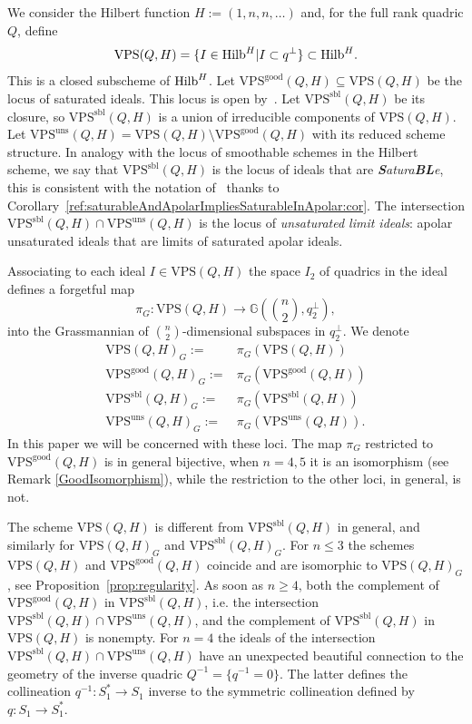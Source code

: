 \documentclass{amsart}
\newcommand{\Hilb}{{\rm{Hilb}}}
\def\Gr #1#2{{\mathbb G}\left(#1,#2\right)} %
\newcommand{\VPSsbl}{{\mathrm{VPS}}^{\mathrm{sbl}}(Q, H)}
\newcommand{\VPSuns}{{\mathrm{VPS}}^{\mathrm{uns}}(Q, H)}
\newcommand{\VPSgood}{{\mathrm{VPS}}^{\mathrm{good}}(Q, H)}
\newcommand{\VPS}{\mathrm{VPS}(Q, H)}
\begin{document}
We consider the Hilbert function $H:=(1,n,n,\ldots )$ and, for the full rank
quadric $Q$, define
$$\VPS=\{I\in \Hilb^H| I\subset q^\perp\}\subset \Hilb^H.$$
This is a closed subscheme of $\Hilb^H$.
Let $\VPSgood\subseteq \VPS$ be the locus of saturated ideals. This
locus is
open by~\cite[Theorem~2.6]{JM}. Let $\VPSsbl$ be its closure, so $\VPSsbl$ is
a union of irreducible components of $\VPS$. Let $\VPSuns = \VPS
\setminus \VPSgood$ with its reduced scheme structure.
In analogy with the locus of smoothable schemes in the Hilbert scheme, we say that $\VPSsbl$  is the locus of ideals that are \emph{{\bf S}atura{\bf BL}e}, this is consistent with the notation of~\cite{JM} thanks to
Corollary~\ref{ref:saturableAndApolarImpliesSaturableInApolar:cor}.
The intersection $\VPSsbl\cap\VPSuns$ is the locus of {\em unsaturated limit
ideals}: apolar unsaturated ideals that are limits of saturated apolar ideals.

Associating to each ideal $I\in \VPS$ the space $I_2$ of quadrics in the ideal defines a forgetful map
$$\pi_G:\VPS\to \Gr{\binom{n}{2}}{q^\perp_2},$$
into the Grassmannian of $\binom{n}{2}$-dimensional subspaces in $q^\perp_2$.
We denote
\begin{align*}
    \VPS_G:=& \pi_G(\VPS)\\
    \VPSgood_G:=& \pi_G(\VPSgood)\\
    \VPSsbl_G:=& \pi_G(\VPSsbl)\\
    \VPSuns_G:=& \pi_G(\VPSuns).
\end{align*}
In this paper we will be concerned with these loci.
The map $\pi_G$ restricted to $\VPSgood$ is in general bijective, when $n=4,5$ it is an isomorphism (see Remark \ref{GoodIsomorphism}), while the restriction to the other loci, in general, is not.




The scheme $\VPS$ is different from $\VPSsbl$ in general, and similarly for $\VPS_G$ and $\VPSsbl_G$. For $n\leq 3$ the schemes
$\VPS$ and $\VPSgood$ coincide
and are isomorphic to $\VPS_G$, see Proposition~\ref{prop:regularity}. As soon as $n\geq 4$, both the
complement of $\VPSgood$ in $\VPSsbl$, i.e. the intersection $\VPSsbl\cap\VPSuns$, and the complement of $\VPSsbl$ in $\VPS$ is nonempty.
For $n=4$ the ideals of the intersection $\VPSsbl\cap\VPSuns$ have an unexpected beautiful connection to
the geometry of the inverse quadric $Q^{-1}=\{q^{-1}=0\}$. The latter defines the collineation $q^{-1}:S^*_1\to S_1$ inverse to the symmetric collineation defined by $q:S_1\to S^*_1$.
\end{document}
